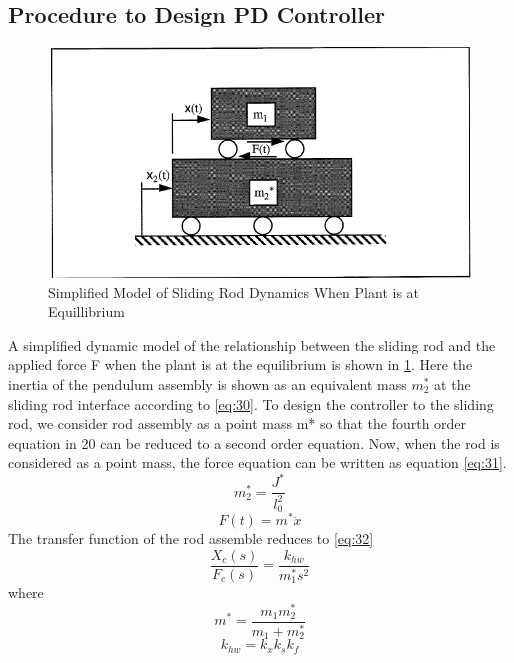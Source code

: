 \documentclass[12pt, a4paper]{article}
\begin{document}
\subsection{Procedure to Design PD Controller}
\begin{figure}[H]
\centering
\includegraphics[width = \textwidth]{equivalentmass.png}
\caption{Simplified Model of Sliding Rod Dynamics When Plant is at Equillibrium}
\label{Fig10}
\end{figure}
A simplified dynamic model of the relationship between the sliding rod and the applied force F when the plant is at the equilibrium is shown in \ref{Fig10}. Here the inertia of the pendulum assembly is shown as an equivalent mass $m_2^*$ at the sliding rod interface according to \eqref{eq:30}. To design the controller to the sliding rod, we consider rod assembly as a point mass m* so that the fourth order equation in 20 can be reduced to a second order equation. Now, when the rod is considered as a point mass, the force equation can be written as equation \eqref{eq:31}.
\begin{equation}\label{eq:30}
m_2^* = \frac{J^*}{l_0^2} 
\end{equation}
\begin{equation}\label{eq:31}
F(t) = m^*\ddot{x}
\end{equation}
The transfer function of the rod assemble reduces to \eqref{eq:32}
\begin{equation}\label{eq:32}
\frac{X_c(s)}{F_c(s)} = \frac{k_{hw}}{m_1^*s^2}
\end{equation}
where
\begin{equation}\label{eq:33}
m^* = \frac{m_1m_2^*}{m_1 + m_2^*}
\end{equation}
\begin{equation}\label{eq:34}
k_{hw} = k_xk_sk_f
\end{equation}
\end{document}
